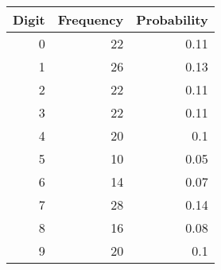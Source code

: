 
    \begin{tabular}{|r|r|r|}
    \toprule
    \hline
    \multicolumn{1}{|c|}{\textbf{Digit}} & \multicolumn{1}{c|}{\textbf{Frequency}} & \multicolumn{1}{c|}{\textbf{Probability}} \\
    \midrule
    \hline
    0     & 22    & 0.11 \\
    1     & 26    & 0.13 \\
    2     & 22    & 0.11 \\
    3     & 22    & 0.11 \\
    4     & 20    & 0.1 \\
    5     & 10    & 0.05 \\
    6     & 14    & 0.07 \\
    7     & 28    & 0.14 \\
    8     & 16    & 0.08 \\
    9     & 20    & 0.1 \\
    \hline
    \end{tabular}%
